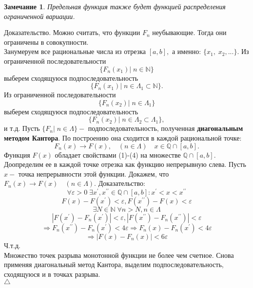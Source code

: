 \documentclass[12 pt, a4 paper]{article}
\theoremstyle{plain}   \newtheorem{Pro}{Задача}
\newtheorem{Rem}{Замечание}
\begin{document}
\begin{Rem}
Предельная функция также будет функцией распределения
ограниченной вариации.
\end{Rem}
{\Large Доказательство.}
Можно считать, что функции
$ F_n $
неубывающие. Тогда они ограничены в совокупности.\\
Занумеруем все рациональные числа из отрезка
$ [a,b] , $
а именно:
$ \{ x_1 , \; x_2 ,... \} . $
Из ограниченной последовательности
$$
  \{ F_n (x_1 )| \; n \in \mathbb{N} \}
$$				 						
выберем сходящуюся подпоследовательность
$$
  \{ F_n (x_1 )| \; n \in \Lambda _1 \subset \mathbb{N} \} .
$$
Из ограниченной последовательности
$$
  \{ F_n (x_2 )| \; n \in \Lambda _1 \}
$$
выберем сходящуюся подпоследовательность
$$
  \{ F_n (x_2 ) | \; n \in \Lambda _2 \subset \Lambda _1 \} ,
$$
и т.д. Пусть
$ \{ F_n | \; n \in \Lambda \} - $
подпоследовательность, полученная
{\bfseries диагональным методом Кантора}.
По построению она сходится в каждой рациональной точке:
$$
  F_n (x) \rightarrow F(x),
  \quad (n \in \Lambda )
  \quad x \in \mathbb{Q} \cap [a,b] .
$$
Функция
$ F(x) $
обладает свойствами (1)-(4) на множестве
$ \mathbb{Q} \cap [a,b] . $
Доопределим ее в каждой точке отрезка как функцию непрерывную слева.
Пусть
$ x - $
точка непрерывности этой функции. Докажем, что
$ F_n (x) \rightarrow F(x) \quad (n \in \Lambda ). $
Доказательство:
$$
  \forall \varepsilon >0 \; \exists x^{\prime},x^{\prime \prime}
  \in \mathbb{Q} \cap [a,b] :
  x^{\prime}<x<x^{\prime \prime}
$$
$$
  F(x)-F(x^{\prime})<\varepsilon ,
  F(x^{\prime \prime})-F(x)<\varepsilon
$$
$$
  \exists N \in \mathbb{N} \; \forall n>N, n \in \Lambda
$$
$$
  |F(x^{\prime})-F_n (x^{\prime})|<\varepsilon ,
  |F(x^{\prime \prime})-F_n (x^{\prime \prime})|<\varepsilon
$$
$$
  \Rightarrow F_n (x^{\prime \prime})-F_n (x^{\prime})<4 \varepsilon
  \Rightarrow F_n (x)-F_n (x^{\prime})<4 \varepsilon
$$
$$
  \Rightarrow |F(x)-F_n (x)|<6 \varepsilon
$$
Ч.т.д.\\
Множество точек разрыва монотонной функции не более чем счетное.
Снова применяя диагональный метод Кантора, выделим подпоследовательность,
сходящуюся и в точках разрыва.\\
$ \triangle $
\\
\end{document}
